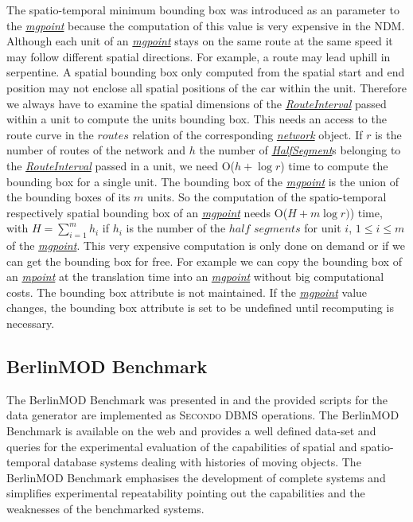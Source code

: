 \documentclass[a4paper]{article}
\newcommand{\secondo}{\textsc{Secondo}}
\newcommand{\bmodb} {BerlinMOD Benchmark}
\newcommand{\dt}[1]{\textsl{\underline{#1}}}
\begin{document}
{The spatio-temporal minimum bounding box was introduced as an parameter to the
\dt{mgpoint} because the computation of this value is very expensive in the
NDM. Although each unit of an \dt{mgpoint} stays on the same route
at the same speed it may follow different spatial directions. For example, a route may
lead uphill in serpentine. A spatial bounding box only computed from the spatial
start and end position may not enclose all spatial positions of the car within
the unit. Therefore we always have to examine the spatial dimensions of the
\dt{RouteInterval} passed within a unit to compute the units bounding box. This
needs an access to the route curve in the $routes$ relation of the corresponding
\dt{network} object. If $r$ is the number of routes
of the network and $h$ the number of \dt{HalfSegment}s belonging to the \dt{RouteInterval}
passed in a unit, we need O($h + \log r$) time to
compute the bounding box for a single unit. The bounding box of the \dt{mgpoint}
is the union of the bounding boxes of its $m$ units. So the computation of the
spatio-temporal respectively spatial bounding box of an \dt{mgpoint} needs
O($H + m \log r)$) time, with $H = \sum_{i=1}^m {h_i}$ if $h_i$ is the number of the
$half$ $segments$ for unit $i$, $1 \leq i \leq m$ of the \dt{mgpoint}. This very expensive computation is only done
on demand or if we can get the bounding box for free. For example we can copy
the bounding box of an \dt{mpoint} at the translation time into an \dt{mgpoint}
without big computational costs. The bounding box attribute is not maintained. If
the \dt{mgpoint} value changes, the bounding box attribute is set to be undefined
until recomputing is necessary.
\subsection{BerlinMOD Benchmark}
\label{sec:bmodb}
The \bmodb{} was presented in \cite{BerlinMODVLDB} and the
provided scripts for the data generator are implemented as \secondo{} DBMS operations.
The \bmodb{} is available on the web \cite{berlinmodweb} and provides a well defined
data-set and queries for the experimental evaluation of the capabilities of
spatial and spatio-temporal database systems dealing with histories of moving
objects. The \bmodb{} emphasises the development of complete systems
and simplifies experimental repeatability pointing out the capabilities and the
weaknesses of the benchmarked systems.

}
\end{document}
